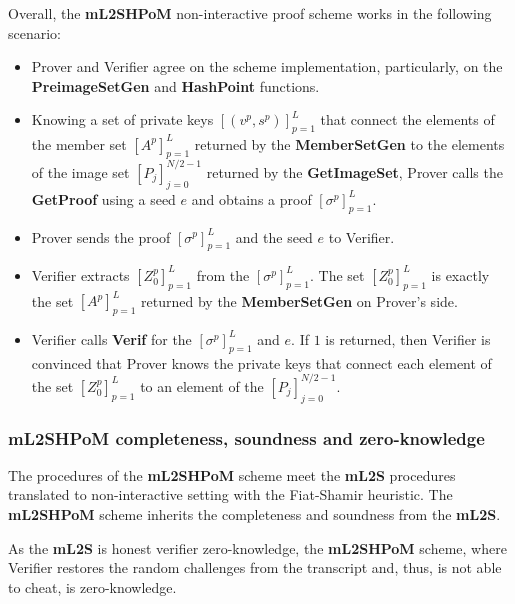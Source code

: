 \documentclass{mathcryptology} %
\theoremstyle{title}
\theoremstyle{titleof}
\begin{document}
    Overall, the \textbf{mL2SHPoM} non-interactive proof scheme works in the following scenario:
    \begin{itemize}
        \item Prover and Verifier agree on the scheme implementation, particularly, on the \textbf{PreimageSetGen} and  \textbf{HashPoint} functions.
        \item Knowing a set of private keys ${\left[\left(v^{p},s^{p}\right)\right]}_{p=1}^{L}$ that connect the elements of the member set ${\left[A^{p}\right]}_{p=1}^{L}$ returned by the \textbf{MemberSetGen} to the elements of the image set ${\left[P_{j}\right]}_{j=0}^{N/2-1}$ returned by the \textbf{GetImageSet}, Prover calls the \textbf{GetProof} using a seed $e$ and obtains a proof ${\left[\sigma^{p}\right]}_{p=1}^{L}$.
        \item Prover sends the proof ${\left[\sigma^{p}\right]}_{p=1}^{L}$ and the seed $e$ to Verifier.
        \item Verifier extracts ${\left[Z_{0}^{p}\right]}_{p=1}^{L}$ from the ${\left[\sigma^{p}\right]}_{p=1}^{L}$. The set ${\left[Z_{0}^{p}\right]}_{p=1}^{L}$ is exactly the set ${\left[A^{p}\right]}_{p=1}^{L}$ returned by the \textbf{MemberSetGen} on Prover's side.
        \item Verifier calls \textbf{Verif} for the ${\left[\sigma^{p}\right]}_{p=1}^{L}$ and $e$. If $1$ is returned, then Verifier is convinced that Prover knows the private keys that connect each element of the set ${\left[Z_{0}^{p}\right]}_{p=1}^{L}$ to an element of the ${\left[P_{j}\right]}_{j=0}^{N/2-1}$.
    \end{itemize}


\subsubsection{mL2SHPoM completeness, soundness and zero-knowledge}\label{Sec:8.2.3.}
    The procedures of the \textbf{mL2SHPoM} scheme meet the \textbf{mL2S} procedures translated to non-interactive setting with the Fiat-Shamir heuristic.
    The \textbf{mL2SHPoM} scheme inherits the completeness and soundness from the \textbf{mL2S}.

    As the \textbf{mL2S} is honest verifier zero-knowledge, the \textbf{mL2SHPoM} scheme, where Verifier restores the random challenges from the transcript and, thus, is not able to cheat, is zero-knowledge.


\end{document}
